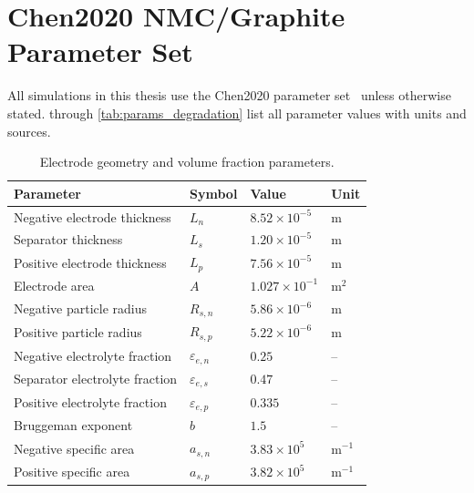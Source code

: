 \chapter{Chen2020 NMC/Graphite Parameter Set}
\label{app:parameters}

All simulations in this thesis use the Chen2020 parameter set~\cite{Chen2020} unless otherwise stated.  through \cref{tab:params_degradation} list all parameter values with units and sources.

\begin{table}[H]
\centering
\caption{Electrode geometry and volume fraction parameters.}
\label{tab:params_geometry}
\begin{tabular}{llll}
\toprule
\textbf{Parameter} & \textbf{Symbol} & \textbf{Value} & \textbf{Unit} \\
\midrule
Negative electrode thickness & $L_n$ & $8.52\times10^{-5}$ & m \\
Separator thickness & $L_s$ & $1.20\times10^{-5}$ & m \\
Positive electrode thickness & $L_p$ & $7.56\times10^{-5}$ & m \\
Electrode area & $A$ & $1.027\times10^{-1}$ & m$^2$ \\
Negative particle radius & $R_{s,n}$ & $5.86\times10^{-6}$ & m \\
Positive particle radius & $R_{s,p}$ & $5.22\times10^{-6}$ & m \\
Negative electrolyte fraction & $\varepsilon_{e,n}$ & $0.25$ & -- \\
Separator electrolyte fraction & $\varepsilon_{e,s}$ & $0.47$ & -- \\
Positive electrolyte fraction & $\varepsilon_{e,p}$ & $0.335$ & -- \\
Bruggeman exponent & $b$ & $1.5$ & -- \\
Negative specific area & $a_{s,n}$ & $3.83\times10^5$ & m$^{-1}$ \\
Positive specific area & $a_{s,p}$ & $3.82\times10^5$ & m$^{-1}$ \\
\bottomrule
\end{tabular}
\end{table}

